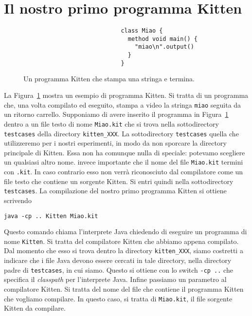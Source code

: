 \section{Il nostro primo programma Kitten}\label{sec:first_kitten_programme}
%
\begin{figure}[t]
\begin{verbatim}
                            class Miao {
                              method void main() {
                                "miao\n".output()
                              }
                            }
\end{verbatim}
\caption{Un programma Kitten che stampa una stringa e termina.}
  \label{fig:miao}
\end{figure}

La Figura~\ref{fig:miao} mostra un esempio di programma Kitten. Si tratta
di un programma che, una volta compilato ed eseguito, stampa a video la
stringa \texttt{miao} seguita da un ritorno carrello.
Supponiamo di avere inserito il programma
in Figura~\ref{fig:miao} dentro a un file testo di nome
\texttt{Miao.kit} che si trova nella sottodirectory
\texttt{testcases} della directory \texttt{kitten\_XXX}.
La sottodirectory \texttt{testcases} \e quella che utilizzeremo
per i nostri esperimenti, in modo da non sporcare la directory
principale di Kitten. Essa non ha comunque nulla di speciale:
potevamo scegliere un qualsiasi altro nome. \E invece importante
che il nome del file \texttt{Miao.kit} termini con \texttt{.kit}.
In caso contrario esso non verr\`a riconosciuto dal compilatore
come un file testo che contiene un sorgente Kitten.
Si entri quindi nella sottodirectory \texttt{testcases}.
La compilazione del nostro primo programma Kitten si ottiene scrivendo
%
\begin{verbatim}
java -cp .. Kitten Miao.kit
\end{verbatim}
%
Questo comando chiama l'interprete Java chiedendo di eseguire un
programma di nome \texttt{Kitten}. Si tratta del compilatore Kitten che
abbiamo appena compilato.
Dal momento che esso si trova dentro la directory \texttt{kitten\_XXX},
siamo costretti a indicare che i file Java devono essere cercati in tale
directory, \cioe nella directory padre di \texttt{testcases}, in cui
siamo. Questo si ottiene con lo switch \texttt{-cp ..} che specifica
il \emph{classpath} per l'interprete Java.
Infine passiamo un parametro al compilatore Kitten. Si tratta del
nome del file che contiene il programma Kitten che vogliamo compilare.
In questo caso, si tratta di \texttt{Miao.kit}, il file sorgente Kitten da
compilare.

